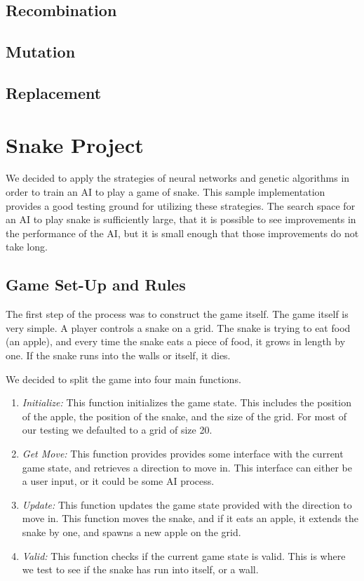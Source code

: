 \documentclass{amsart}
\begin{document}
\subsection{Recombination}

\subsection{Mutation}

\subsection{Replacement}

\section{Snake Project}

We decided to apply the strategies of neural networks and genetic algorithms in
order to train an AI to play a game of snake. This sample implementation
provides a good testing ground for utilizing these strategies. The search space
for an AI to play snake is sufficiently large, that it is possible to see
improvements in the performance of the AI, but it is small enough that those
improvements do not take long.

\subsection{Game Set-Up and Rules}

The first step of the process was to construct the game itself. The game
itself is very simple. A player controls a snake on a grid. The snake is
trying to eat food (an apple), and every time the snake eats a piece of food,
it grows in length by one. If the snake runs into the walls or itself, it dies.

We decided to split the game into four main functions.
\begin{enumerate}
  \item \textit{Initialize:} This function initializes the game state. This
    includes the position of the apple, the position of the snake, and the size
    of the grid. For most of our testing we defaulted to a grid of size 20.
  \item \textit{Get Move:} This function provides provides some interface with
    the current game state, and retrieves a direction to move in. This
    interface can either be a user input, or it could be some AI process.
  \item \textit{Update:} This function updates the game state provided with
    the direction to move in. This function moves the snake, and if it eats an
    apple, it extends the snake by one, and spawns a new apple on the grid.
  \item \textit{Valid:} This function checks if the current game state is
    valid. This is where we test to see if the snake has run into itself, or a
    wall.
\end{enumerate}
\end{document}
